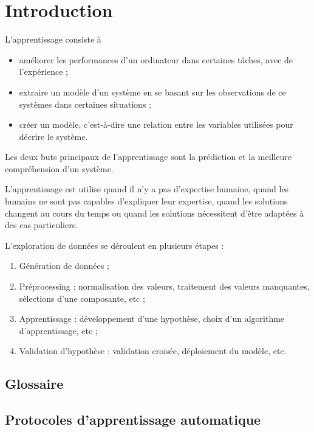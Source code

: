 \chapter{Introduction}

L'apprentissage consiste à

\begin{itemize}
	\item améliorer les performances d'un ordinateur dans certaines tâches, avec de l'expérience ;
	\item extraire un modèle d'un système en se basant sur les observations de ce systèmes dans certaines situations ;
	\item créer un modèle, c'est-à-dire une relation entre les variables utilisées pour décrire le système.
\end{itemize}

Les deux buts principaux de l'apprentissage sont la prédiction et la meilleure compréhension d'un système.

L'apprentissage est utilise quand il n'y a pas d'expertise humaine, quand les humains ne sont pas capables d'expliquer leur expertise, quand les solutions changent au cours du temps ou quand les solutions nécessitent d'être adaptées à des cas particuliers.


L'exploration de données se déroulent en plusieurs étapes :

\begin{enumerate}
	\item Génération de données ;
	\item Préprocessing : normalisation des valeurs, traitement des valeurs manquantes, sélections d'une composante, etc ;
	\item Apprentissage : développement d'une hypothèse, choix d'un algorithme d'apprentissage, etc ;
	\item Validation d'hypothèse : validation croisée, déploiement du modèle, etc.
\end{enumerate}

	\section{Glossaire}
	

	\section{Protocoles d'apprentissage automatique}
		
